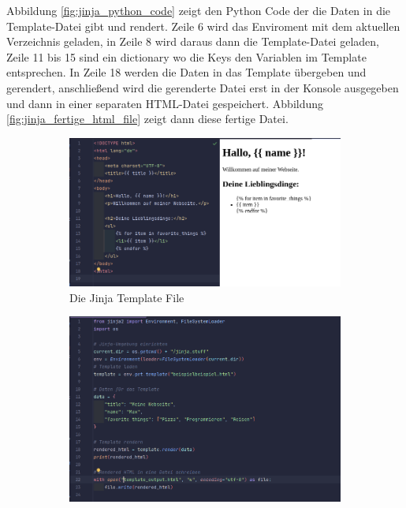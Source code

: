 \documentclass[a4paper, 12pt]{article}
\begin{document}
Abbildung \ref{fig:jinja_python_code} zeigt den Python Code der die Daten in die Template-Datei gibt und rendert. Zeile 6 wird das Enviroment mit dem aktuellen Verzeichnis geladen, in Zeile 8 wird daraus dann die Template-Datei geladen, Zeile 11 bis 15 sind ein dictionary wo die Keys den Variablen im Template entsprechen. In Zeile 18 werden die Daten in das Template übergeben und gerendert, anschließend wird die gerenderte Datei erst in der Konsole ausgegeben und dann in einer separaten HTML-Datei gespeichert.
Abbildung \ref{fig:jinja_fertige_html_file} zeigt dann diese fertige Datei. \cite{jinja_doku} 

\begin{figure}[H]
	\hspace*{-2cm}
    \begin{subfigure}{0.6\textwidth}
        \includegraphics[width=\linewidth]{jinja_template.png}
        \caption{Die Jinja Template File}
        \label{fig:jinja_template}
    \end{subfigure}
	\hspace*{1.5cm}
    \begin{subfigure}{0.55\textwidth}
        \includegraphics[width=\linewidth]{jinja_python_code.png}

\end{subfigure}
\end{figure}
\end{document}
